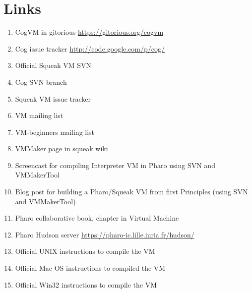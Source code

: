 \documentclass[a4paper,10pt,twoside]{book}
\begin{document}
\section{Links}
\begin{enumerate}
\item CogVM in gitorious \url{https://gitorious.org/cogvm}
\item Cog issue tracker \url{http://code.google.com/p/cog/}
\item Official Squeak VM SVN
\item Cog SVN branch
\item Squeak VM issue tracker
\item VM mailing list
\item VM-beginners mailing list
\item VMMaker page in squeak wiki
\item Screencast for compiling Interpreter VM in Pharo using SVN and VMMakerTool
\item Blog post for building a Pharo/Squeak VM from first Principles (using SVN and VMMakerTool)
\item Pharo collaborative book, chapter in Virtual Machine
\item Pharo Hudson server \url{https://pharo-ic.lille.inria.fr/hudson/}
\item Official UNIX instructions to compile the VM
\item Official Mac OS instructions to compiled the VM
\item Official Win32 instructions to compile the VM
\end{enumerate}






\ifx\wholebook\relax\else
   
   
\end{document}

